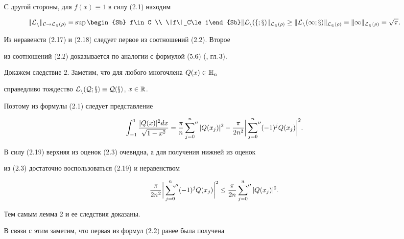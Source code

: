 С другой стороны, для $f(x)\equiv 1$ в силу (2.1) находим


\begin{equation}


\|\cal{L}_n\|_{C\to L_2(\rho)}=\sup\begin{Sb} f\in C \\ \|f\|_C\le 1\end{Sb}


\|\cal{L}_n(f;x)\|_{L_2(\rho)}\ge


\|\cal{L}_n(1;x)\|_{L_2(\rho)}=\|1\|_{L_2(\rho)}=\sqrt{\pi}.


\end{equation}


Из неравенств (2.17) и (2.18) следует первое из соотношений (2.2). Второе 


из соотношений (2.2) доказывается по аналогии с формулой (5.6) (\cite{3}, гл.\,3).





Докажем следствие 2. Заметим, что для любого многочлена $Q(x)\in\Bbb{H}_n$


справедливо тождество $\cal{L}_n(Q;x)\equiv Q(x)$, $x\in \Bbb{R}$.


Поэтому из формулы (2.1) следует представление


\begin{equation}


\int_{-1}^1\frac{|Q(x)|^2dx}{\sqrt{1-x^2}}=\frac{\pi}n


\sideset{}{''}\sum_{j=0}^n |Q(x_j)|^2 -


\frac{\pi}{2n^2}\bigg|\sideset{}{''}\sum_{j=0}^n(-1)^jQ(x_j)\bigg|^2.


\end{equation}


В силу (2.19) верхняя из оценок (2.3) очевидна, а для получения нижней из оценок 


из (2.3) достаточно воспользоваться (2.19) и неравенством


$$


\frac{\pi}{2n^2}\bigg|\sideset{}{''}\sum_{j=0}^n (-1)^j Q(x_j)\bigg|^2 \le


\frac{\pi}{2n}\sideset{}{''}\sum_{j=0}^n |Q(x_j)|^2.


$$





Тем самым лемма 2 и ее следствия доказаны.


В связи с этим заметим, что первая из формул (2.2) ранее была получена


